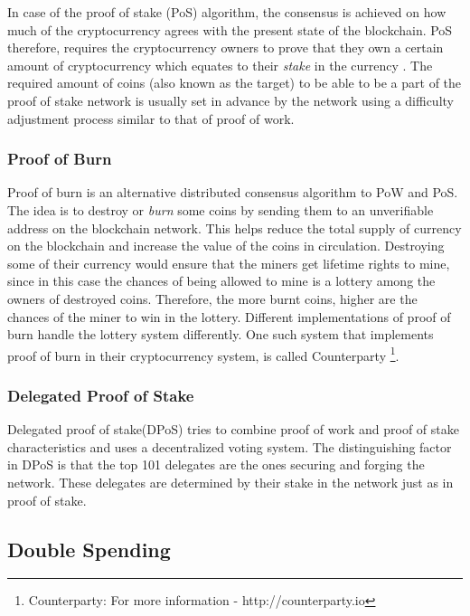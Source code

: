 \documentclass[english]{tktltiki}
\begin{document}
In case of the proof of stake (PoS) algorithm, the consensus is achieved on how much of the cryptocurrency agrees with the present state of the blockchain. PoS therefore, requires the cryptocurrency owners to prove that they own a certain amount of cryptocurrency which equates to their \textit{stake} in the currency \cite{pos}. The required amount of coins (also known as the target) to be able to be a part of the proof of stake network is usually set in advance by the network using a difficulty adjustment process similar to that of proof of work.

\subsubsection{Proof of Burn}

Proof of burn\cite{proofofburn} is an alternative distributed consensus algorithm to PoW and PoS. The idea is to destroy or \textit{burn} some coins by sending them to an unverifiable address on the blockchain network. This helps reduce the total supply of currency on the blockchain and increase the value of the coins in circulation. Destroying some of their currency would ensure that the miners get lifetime rights to mine, since in this case the chances of being allowed to mine is a lottery among the owners of destroyed coins. Therefore, the more burnt coins, higher are the chances of the miner to win in the lottery. Different implementations of proof of burn handle the lottery system differently. One such system that implements proof of burn in their cryptocurrency system, is called Counterparty \footnote{Counterparty: For more information - http://counterparty.io}.

\subsubsection{Delegated Proof of Stake}
Delegated proof of stake(DPoS)\cite{dpos} tries to combine proof of work and proof of stake characteristics and uses a decentralized voting system. The distinguishing factor in DPoS is that the top 101 delegates are the ones securing and forging the network. These delegates are determined by their stake in the network just as in proof of stake.

\subsection{Double Spending}
\end{document}
